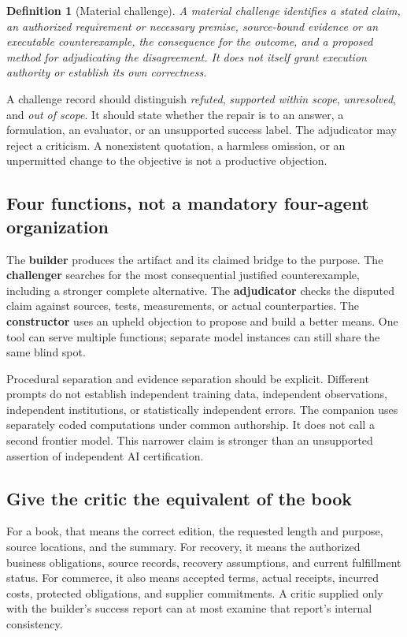 \documentclass[11pt,a4paper]{article}
\newcommand{\term}[1]{\textbf{#1}}
\newtheorem{definition}{Definition}[section]
\begin{document}
\begin{definition}[Material challenge]
A material challenge identifies a stated claim, an authorized requirement or necessary premise, source-bound evidence or an executable counterexample, the consequence for the outcome, and a proposed method for adjudicating the disagreement. It does not itself grant execution authority or establish its own correctness.
\end{definition}

A challenge record should distinguish \emph{refuted}, \emph{supported within scope}, \emph{unresolved}, and \emph{out of scope}. It should state whether the repair is to an answer, a formulation, an evaluator, or an unsupported success label. The adjudicator may reject a criticism. A nonexistent quotation, a harmless omission, or an unpermitted change to the objective is not a productive objection.

\subsection{Four functions, not a mandatory four-agent organization}
The \term{builder} produces the artifact and its claimed bridge to the purpose. The \term{challenger} searches for the most consequential justified counterexample, including a stronger complete alternative. The \term{adjudicator} checks the disputed claim against sources, tests, measurements, or actual counterparties. The \term{constructor} uses an upheld objection to propose and build a better means. One tool can serve multiple functions; separate model instances can still share the same blind spot.

Procedural separation and evidence separation should be explicit. Different prompts do not establish independent training data, independent observations, independent institutions, or statistically independent errors. The companion uses separately coded computations under common authorship. It does not call a second frontier model. This narrower claim is stronger than an unsupported assertion of independent AI certification.

\subsection{Give the critic the equivalent of the book}
For a book, that means the correct edition, the requested length and purpose, source locations, and the summary. For recovery, it means the authorized business obligations, source records, recovery assumptions, and current fulfillment status. For commerce, it also means accepted terms, actual receipts, incurred costs, protected obligations, and supplier commitments. A critic supplied only with the builder's success report can at most examine that report's internal consistency.
\end{document}

